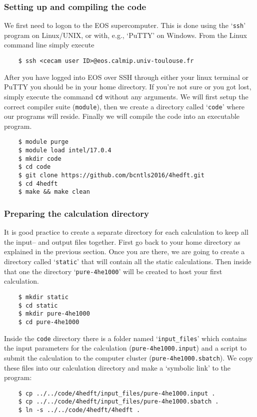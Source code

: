 \documentclass[10pt,a4paper]{article}
\begin{document}
	\subsubsection{Setting up and compiling the code}\label{compiling}
	We first need to logon to the EOS supercomputer. This is done using the `\verb|ssh|' program on Linux/UNIX, or with, e.g., `PuTTY' on Windows. From the Linux command line simply execute
	\begin{verbatim}
	$ ssh <cecam user ID>@eos.calmip.univ-toulouse.fr
	\end{verbatim}
	After you have logged into EOS over SSH through either your linux terminal or PuTTY you should be in your home directory. If you're not sure or you got lost, simply execute the command \verb|cd| without any arguments. We will first setup the correct compiler suite (\verb|module|), then we create a directory called `\verb|code|' where our programs will reside. Finally we will compile the code into an executable program.
	\begin{verbatim}
	$ module purge
	$ module load intel/17.0.4
	$ mkdir code
	$ cd code
	$ git clone https://github.com/bcntls2016/4hedft.git
	$ cd 4hedft
	$ make && make clean
	\end{verbatim}
	
	\subsubsection{Preparing the calculation directory}
	\label{sec:setup}
	It is good practice to create a separate directory for each calculation to keep all the input-- and output files together. First go back to your home directory as explained in the previous section. Once you are there, we are going to create a directory called `\verb|static|' that will contain all the static calculations. Then inside that one the directory `\verb|pure-4he1000|' will be created to host your first calculation.
	\begin{verbatim}
	$ mkdir static
	$ cd static
	$ mkdir pure-4he1000
	$ cd pure-4he1000
	\end{verbatim}
	
	Inside the \verb|code| directory there is a folder named `\verb|input_files|' which contains the input parameters for the calculation (\verb|pure-4he1000.input|) and a script to submit the calculation to the computer cluster (\verb|pure-4he1000.sbatch|). We copy these files into our calculation directory and make a `symbolic link' to the program:
	\begin{verbatim}
	$ cp ../../code/4hedft/input_files/pure-4he1000.input .
	$ cp ../../code/4hedft/input_files/pure-4he1000.sbatch .
	$ ln -s ../../code/4hedft/4hedft .
	\end{verbatim}
	
\end{document}
